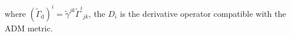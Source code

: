 %
%
where $(\widetilde{\Gamma}_{\text{d}})^i = \widetilde{\gamma}^{jk}{\widetilde{\Gamma}^i}_{jk}$, 
the $D_i$ is the derivative operator compatible with the \ac{ADM} metric.
%

%
%
%
%
%
%
%


